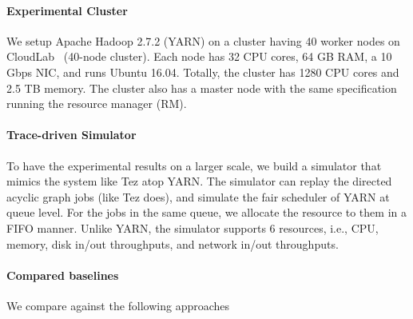 \paragraph{Experimental Cluster}
We setup Apache Hadoop 2.7.2 (YARN) on a cluster having 40 worker nodes on CloudLab~\cite{cloudlab} (40-node cluster).
Each node has 32 CPU cores, 64 GB RAM, a 10 Gbps NIC, and runs Ubuntu 16.04.
Totally, the cluster has 1280 CPU cores and 2.5 TB memory.
The cluster also has a master node with the same specification running the resource manager (RM).


\paragraph{Trace-driven Simulator} To have the experimental results on a larger scale, we build a simulator that mimics the system like Tez atop YARN.
The simulator can replay the directed acyclic graph jobs (like Tez does), and simulate the fair scheduler of YARN at queue level.
For the jobs in the same queue, we allocate the resource to them in a FIFO manner.
Unlike YARN, the simulator supports 6 resources, i.e., CPU, memory, disk in/out throughputs, and network in/out throughputs.

\paragraph{Compared baselines} We compare \name against the following approaches

